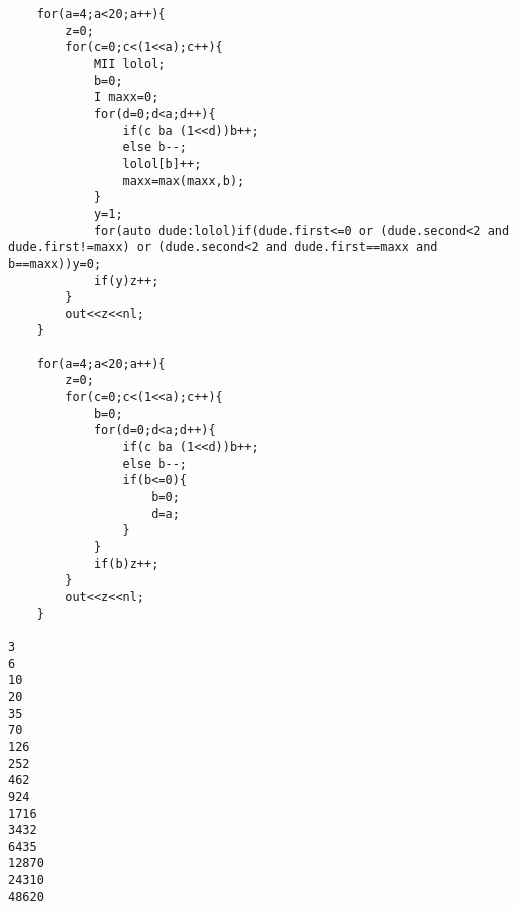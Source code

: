 

\begin{verbatim}
	for(a=4;a<20;a++){
		z=0;
		for(c=0;c<(1<<a);c++){
			MII lolol;
			b=0;
			I maxx=0;
			for(d=0;d<a;d++){
				if(c ba (1<<d))b++;
				else b--;
				lolol[b]++;
				maxx=max(maxx,b);
			}
			y=1;
			for(auto dude:lolol)if(dude.first<=0 or (dude.second<2 and dude.first!=maxx) or (dude.second<2 and dude.first==maxx and b==maxx))y=0;
			if(y)z++;
		}
		out<<z<<nl;
	}

	for(a=4;a<20;a++){
		z=0;
		for(c=0;c<(1<<a);c++){
			b=0;
			for(d=0;d<a;d++){
				if(c ba (1<<d))b++;
				else b--;
				if(b<=0){
					b=0;
					d=a;
				}
			}
			if(b)z++;
		}
		out<<z<<nl;
	}

3
6
10
20
35
70
126
252
462
924
1716
3432
6435
12870
24310
48620

\end{verbatim}



